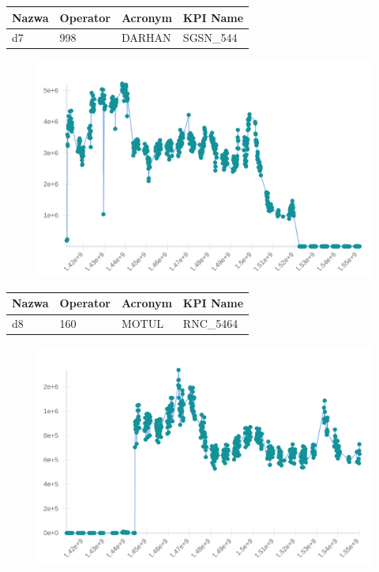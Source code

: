 \documentclass[eng,printmode]{mgr}
\begin{document}
\begingroup
\fontsize{10pt}{12pt}\selectfont
\begin{tabu} to 0.9\textwidth { | X[l] | X[l] | X[l] | X[l] |}
\hline
\textbf{Nazwa} & \textbf{Operator} & \textbf{Acronym} & \textbf{KPI Name} \\
\hline
d7 & 998 & DARHAN & SGSN\_544 \\
\hline
\end{tabu}
\endgroup

\begin{figure}[H]
  \begin{center}
  \includegraphics[scale=0.4]{d7}
  \end{center}
\end{figure}
\newpage

\begingroup
\fontsize{10pt}{12pt}\selectfont
\begin{tabu} to 0.9\textwidth { | X[l] | X[l] | X[l] | X[l] |}
\hline
\textbf{Nazwa} & \textbf{Operator} & \textbf{Acronym} & \textbf{KPI Name} \\
\hline
d8 & 160 & MOTUL & RNC\_5464 \\
\hline
\end{tabu}
\endgroup

\begin{figure}[H]
  \begin{center}
  \includegraphics[scale=0.4]{d8}
  \end{center}
\end{figure}
\newpage
\end{document}

